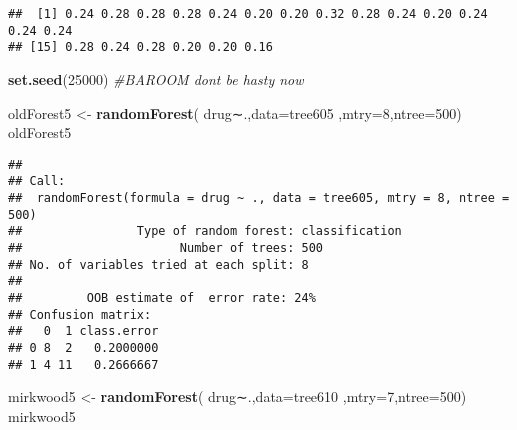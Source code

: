 \documentclass[]{article}
\newenvironment{Shaded}{\begin{snugshade}}{\end{snugshade}}
\newcommand{\KeywordTok}[1]{\textcolor[rgb]{0.13,0.29,0.53}{\textbf{#1}}}
\newcommand{\DataTypeTok}[1]{\textcolor[rgb]{0.13,0.29,0.53}{#1}}
\newcommand{\DecValTok}[1]{\textcolor[rgb]{0.00,0.00,0.81}{#1}}
\newcommand{\StringTok}[1]{\textcolor[rgb]{0.31,0.60,0.02}{#1}}
\newcommand{\CommentTok}[1]{\textcolor[rgb]{0.56,0.35,0.01}{\textit{#1}}}
\newcommand{\ControlFlowTok}[1]{\textcolor[rgb]{0.13,0.29,0.53}{\textbf{#1}}}
\newcommand{\OperatorTok}[1]{\textcolor[rgb]{0.81,0.36,0.00}{\textbf{#1}}}
\newcommand{\NormalTok}[1]{#1}
\begin{document}
\begin{Shaded}
\end{Shaded}

\begin{verbatim}
##  [1] 0.24 0.28 0.28 0.28 0.24 0.20 0.20 0.32 0.28 0.24 0.20 0.24 0.24 0.24
## [15] 0.28 0.24 0.28 0.20 0.20 0.16
\end{verbatim}

\begin{Shaded}
\begin{Highlighting}[]
\KeywordTok{set.seed}\NormalTok{(}\DecValTok{25000}\NormalTok{)}
\CommentTok{#BAROOM dont be hasty now}

\NormalTok{oldForest5 <-}\StringTok{ }\KeywordTok{randomForest}\NormalTok{( drug∼.,}\DataTypeTok{data=}\NormalTok{tree605  ,}\DataTypeTok{mtry=}\DecValTok{8}\NormalTok{,}\DataTypeTok{ntree=}\DecValTok{500}\NormalTok{)}
\NormalTok{oldForest5}
\end{Highlighting}
\end{Shaded}

\begin{verbatim}
## 
## Call:
##  randomForest(formula = drug ~ ., data = tree605, mtry = 8, ntree = 500) 
##                Type of random forest: classification
##                      Number of trees: 500
## No. of variables tried at each split: 8
## 
##         OOB estimate of  error rate: 24%
## Confusion matrix:
##   0  1 class.error
## 0 8  2   0.2000000
## 1 4 11   0.2666667
\end{verbatim}

\begin{Shaded}
\begin{Highlighting}[]
\NormalTok{mirkwood5 <-}\StringTok{ }\KeywordTok{randomForest}\NormalTok{( drug∼.,}\DataTypeTok{data=}\NormalTok{tree610  ,}\DataTypeTok{mtry=}\DecValTok{7}\NormalTok{,}\DataTypeTok{ntree=}\DecValTok{500}\NormalTok{)}
\NormalTok{mirkwood5}
\end{Highlighting}
\end{Shaded}
\end{document}
